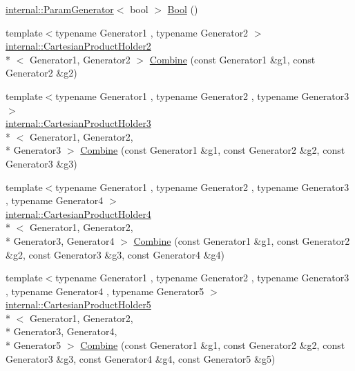 \begin{DoxyCompactItemize}
\item 
\hyperlink{classtesting_1_1internal_1_1ParamGenerator}{internal\-::\-Param\-Generator}$<$ bool $>$ \hyperlink{namespacetesting_aa9f9150ed43f949c8a6bacf3f04c03ce}{Bool} ()
\item 
{\footnotesize template$<$typename Generator1 , typename Generator2 $>$ }\\\hyperlink{classtesting_1_1internal_1_1CartesianProductHolder2}{internal\-::\-Cartesian\-Product\-Holder2}\\*
$<$ Generator1, Generator2 $>$ \hyperlink{namespacetesting_a4917922963bacef3e301e67366c41df3}{Combine} (const Generator1 \&g1, const Generator2 \&g2)
\item 
{\footnotesize template$<$typename Generator1 , typename Generator2 , typename Generator3 $>$ }\\\hyperlink{classtesting_1_1internal_1_1CartesianProductHolder3}{internal\-::\-Cartesian\-Product\-Holder3}\\*
$<$ Generator1, Generator2, \\*
Generator3 $>$ \hyperlink{namespacetesting_a77b89180fd846e275236409d9704eda2}{Combine} (const Generator1 \&g1, const Generator2 \&g2, const Generator3 \&g3)
\item 
{\footnotesize template$<$typename Generator1 , typename Generator2 , typename Generator3 , typename Generator4 $>$ }\\\hyperlink{classtesting_1_1internal_1_1CartesianProductHolder4}{internal\-::\-Cartesian\-Product\-Holder4}\\*
$<$ Generator1, Generator2, \\*
Generator3, Generator4 $>$ \hyperlink{namespacetesting_abf420810fcd8190a98c2927862805a3f}{Combine} (const Generator1 \&g1, const Generator2 \&g2, const Generator3 \&g3, const Generator4 \&g4)
\item 
{\footnotesize template$<$typename Generator1 , typename Generator2 , typename Generator3 , typename Generator4 , typename Generator5 $>$ }\\\hyperlink{classtesting_1_1internal_1_1CartesianProductHolder5}{internal\-::\-Cartesian\-Product\-Holder5}\\*
$<$ Generator1, Generator2, \\*
Generator3, Generator4, \\*
Generator5 $>$ \hyperlink{namespacetesting_a81505186d64f5b5763a0e268bc2e5650}{Combine} (const Generator1 \&g1, const Generator2 \&g2, const Generator3 \&g3, const Generator4 \&g4, const Generator5 \&g5)
\item 

\end{DoxyCompactItemize}
